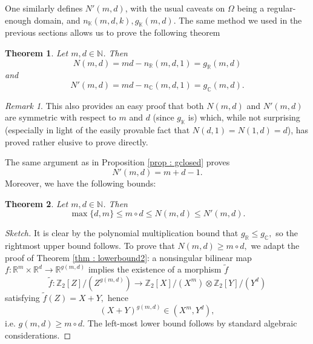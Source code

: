 \documentclass[11pt, a4paper, reqno]{elsarticle}
\newtheorem{theorem}{Theorem}[section]
\theoremstyle{definition}
\theoremstyle{remark}
\newtheorem{remark}{Remark}
\begin{document}
One similarly defines $N'(m,d)$, with
the usual caveats on $\Omega$ being a regular-enough domain,
and $n_{\mathbb K}(m,d,k), g_{\mathbb K}(m,d)$. 
The same method we used in the previous sections allows us to 
prove the following theorem
\begin{theorem}
    Let $m,d\in\mathbb N$. Then
    \begin{equation*}
        N(m,d)=md-n_{\mathbb R}(m,d,1)=g_{\mathbb R}(m,d)
    \end{equation*}
    and
    \begin{equation*}
        N'(m,d)=md-n_{\mathbb C}(m,d,1)=
        g_{\mathbb C}(m,d).
    \end{equation*}\end{theorem}
\begin{remark}
This also provides an easy proof
that both $N(m,d)$ and $N'(m,d)$
are symmetric with respect to $m$ and $d$ (since $g_{\mathbb K}$ is)
which, while not surprising
(especially in light of the easily
provable fact that $N(d,1)=N(1,d)=d$),
    has proved rather elusive to 
    prove directly.
\end{remark}
The same argument as in 
Proposition \ref{prop : gclosed} 
proves
\begin{equation*}
    N'(m,d)=m+d-1.
\end{equation*}
Moreover, we have the following
bounds:
\begin{theorem}
Let $m,d\in\mathbb{N}$. Then
\begin{equation*}
    \max\{d,m\}\le m\circ d\le N(m,d)\le
    N'(m,d).
\end{equation*}    
\end{theorem}
\begin{proof}[Sketch]
    It is clear by the polynomial multiplication bound
    that 
    $g_{\mathbb{R}}\le g_{\mathbb{C}},$ so the rightmost
    upper bound follows. To prove
    that $N(m,d)\ge m\circ d,$
    we adapt the proof of Theorem \ref{thm : lowerbound2}: a nonsingular bilinear map $f\colon\mathbb{R}^m\times\mathbb{R}^d\to \mathbb{R}^{g(m,d)}$
    implies the existence of a
    morphism $\tilde f$
    \begin{equation*}
        \tilde f\colon
        \mathbb Z_2[Z]/(Z^{g(m,d)})\to \mathbb Z_2[X]/(X^m)
        \otimes \mathbb Z_2[Y]/(Y^d)
    \end{equation*}
    satisfying $\tilde f(Z)=X+Y,$
    hence
    \begin{equation*}
        (X+Y)^{g(m,d)}\in (X^m,Y^d),
    \end{equation*}
    i.e. $g(m,d)\ge m\circ d$. 
    The left-most lower bound follows
    by standard algebraic considerations.
\end{proof}
\end{document}

